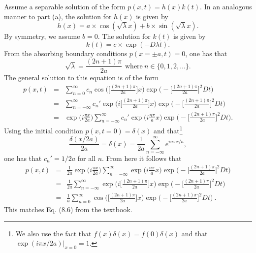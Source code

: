 Assume a separable solution of the form $p(x,t) = h(x) k(t)$.
In an analogous manner to part (a), the solution for $h(x)$ is given by
\begin{equation}
h(x) = a \times \cos(\sqrt{\lambda} x) + b \times \sin(\sqrt{\lambda} x).
\end{equation}
By symmetry, we assume $b=0$. The solution for $k(t)$ is given by
\begin{equation}
k(t) = c \times \exp(- D \lambda t).
\end{equation}
From the absorbing boundary conditions $p(x=\pm a, t) = 0$, one has that
\begin{equation}
\sqrt{\lambda} = \frac{(2n+1) \pi}{2a} ~~\text{where}~n \in \{0, 1, 2, \ldots\}.
\end{equation}
The general solution to this equation is of the form
\begin{eqnarray}
p(x,t) &=& \sum_{n=0}^{\infty} c_n \cos\bigg(\bigg[\frac{(2n+1) \pi}{2a} \bigg]  x \bigg) \exp\bigg(-\bigg[\frac{(2n+1) \pi}{2a} \bigg]^2 D t \bigg) \nonumber \\
&=& \sum_{n=-\infty}^{\infty} c_n' \exp\bigg(i\bigg[\frac{(2n+1) \pi}{2a} \bigg]  x \bigg) \exp\bigg(-\bigg[\frac{(2n+1) \pi}{2a} \bigg]^2 D t \bigg) \nonumber \\
&=& \exp\bigg(i\frac{\pi x}{2a} \bigg) \sum_{n=-\infty}^{\infty} c_n' \exp\bigg(i\frac{n \pi}{a} x \bigg) \exp\bigg(-\bigg[\frac{(2n+1) \pi}{2a} \bigg]^2 D t \bigg). \label{eq:gen_soln_abs_bound}
\end{eqnarray}
Using the initial condition $p(x, t=0) = \delta(x)$  and that\footnote{We also use the fact that $f(x)\delta(x)=f(0)\delta(x)$ and that $\exp(i\pi x/2a)|_{x=0} = 1$.}
\begin{equation}
\frac{\delta(x/2a)}{2 a} = \delta(x)= \frac{1}{2 a }\sum_{n=-\infty}^{\infty} e^{i n \pi x /a},
\end{equation}
one has that $c_n' = 1/ 2a$ for all $n$. From here it follows that
\begin{eqnarray}
p(x,t) &=& \frac{1}{2a} \exp\bigg(i\frac{\pi x}{2a} \bigg) \sum_{n=-\infty}^{\infty} \exp\bigg(i\frac{n \pi}{a} x \bigg) \exp\bigg(-\bigg[\frac{(2n+1) \pi}{2a} \bigg]^2 D t \bigg) \nonumber \\
&=& \frac{1}{2a} \sum_{n=-\infty}^{\infty} \exp\bigg(i\bigg[\frac{(2n+1) \pi}{2a} \bigg] x \bigg) \exp\bigg(-\bigg[\frac{(2n+1) \pi}{2a} \bigg]^2 D t \bigg) \nonumber \\
&=& \boxed{\frac{1}{a} \sum_{n=0}^{\infty} \cos\bigg(\bigg[\frac{(2n+1) \pi}{2a} \bigg] x \bigg) \exp\bigg(-\bigg[\frac{(2n+1) \pi}{2a} \bigg]^2 D t \bigg)}~.
\end{eqnarray}
This matches Eq. (8.6) from the textbook.

